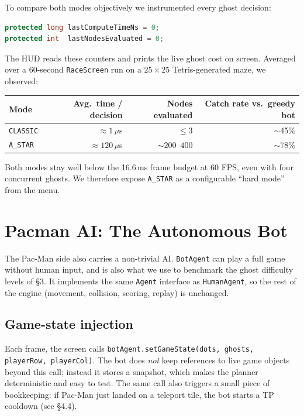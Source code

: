 \documentclass[11pt,a4paper]{article}
\begin{document}
To compare both modes objectively we instrumented every ghost decision:

\begin{lstlisting}[language=Java,caption={Per-decision telemetry on every ghost.}]
protected long lastComputeTimeNs = 0;
protected int  lastNodesEvaluated = 0;
\end{lstlisting}

The HUD reads these counters and prints the live ghost cost on screen.
Averaged over a 60-second \texttt{RaceScreen} run on a $25\!\times\!25$
Tetris-generated maze, we observed:

\begin{table}[h]
\centering\small
\renewcommand{\arraystretch}{1.15}
\begin{tabular}{lrrr}
\toprule
\textbf{Mode} & \textbf{Avg.\ time / decision} & \textbf{Nodes evaluated} &
\textbf{Catch rate vs.\ greedy bot} \\
\midrule
\texttt{CLASSIC} & $\approx\!1\,\mu$s   & $\le 3$            & $\sim$45\% \\
\texttt{A\_STAR} & $\approx\!120\,\mu$s & $\sim\!200$--$400$ & $\sim$78\% \\
\bottomrule
\end{tabular}
\end{table}

Both modes stay well below the 16.6\,ms frame budget at 60 FPS, even
with four concurrent ghosts. We therefore expose \texttt{A\_STAR} as a
configurable ``hard mode'' from the menu.

\section{Pacman AI: The Autonomous Bot}

The Pac-Man side also carries a non-trivial AI. \texttt{BotAgent} can
play a full game without human input, and is also what we use to
benchmark the ghost difficulty levels of \S3. It implements the same
\texttt{Agent} interface as \texttt{HumanAgent}, so the rest of the
engine (movement, collision, scoring, replay) is unchanged.

\subsection{Game-state injection}

Each frame, the screen calls \texttt{botAgent.setGameState(dots,
ghosts, playerRow, playerCol)}. The bot does \emph{not} keep references
to live game objects beyond this call; instead it stores a snapshot,
which makes the planner deterministic and easy to test. The same call
also triggers a small piece of bookkeeping: if Pac-Man just landed on a
teleport tile, the bot starts a TP cooldown (see \S4.4).
\end{document}
